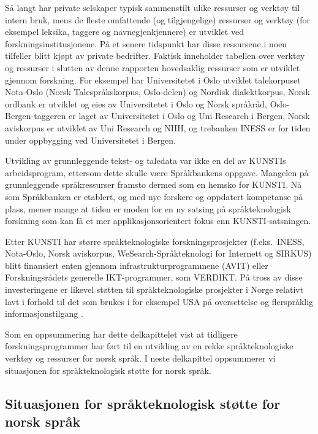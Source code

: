 \begin{multicols}{2}
Så langt har private selskaper typisk sammenstilt ulike ressurser og verktøy til intern bruk, mens de fleste omfattende (og tilgjengelige) ressurser og verktøy (for eksempel leksika, taggere og navnegjenkjennere) er utviklet ved forskningsinstitusjonene. På et senere tidspunkt har disse ressursene i noen tilfeller blitt kjøpt av private bedrifter. Faktisk inneholder tabellen over verktøy og ressurser i slutten av denne rapporten hovedsaklig ressurser som er utviklet gjennom forskning. For eksempel har Universitetet i Oslo utviklet talekorpuset Nota-Oslo (Norsk Talespråkskorpus, Oslo-delen) og Nordisk dialektkorpus, Norsk ordbank er utviklet og eies av Universitetet i Oslo og Norsk språkråd, Oslo-Bergen-taggeren er laget av Universitetet i Oslo og Uni Research i Bergen, Norsk aviskorpus er utviklet av Uni Research og NHH, og trebanken INESS er for tiden under oppbygging ved Universitetet i Bergen.

Utvikling av grunnleggende tekst- og taledata var ikke en del av KUNSTIs arbeidsprogram, ettersom dette skulle være Språkbankens oppgave. Mangelen på grunnleggende språkressurser framsto dermed som en hemsko for KUNSTI. Nå som Språkbanken er etablert, og med nye forskere og oppdatert kompetanse på plass, mener mange at tiden er moden for en ny satsing på språkteknologisk forskning som kan få et mer applikasjonsorientert fokus enn KUNSTI-satsningen.

Etter KUNSTI har større språkteknologiske forskningsprosjekter (f.eks.~INESS, Nota-Oslo, Norsk aviskorpus, WeSearch-Språkteknologi for Internett og SIRKUS) blitt finansiert enten gjennom infrastrukturprogrammene (AVIT) eller Forskningsrådets generelle IKT-programmer, som VERDIKT. 
På tross av disse investeringene er likevel støtten til språkteknologiske prosjekter i Norge relativt lavt i forhold til det som brukes i for eksempel USA på oversettelse og flerspråklig informasjonstilgang \cite{laz1}.

Som en oppsummering har dette delkapittelet vist at tidligere forskningsprogrammer har ført til en utvikling av en rekke språkteknologiske verktøy og ressurser for norsk språk. 
I neste delkapittel oppsummerer vi situasjonen for språkteknologisk støtte for norsk språk. 
  
\subsection{Situasjonen for språkteknologisk støtte for norsk språk}


\end{multicols}
